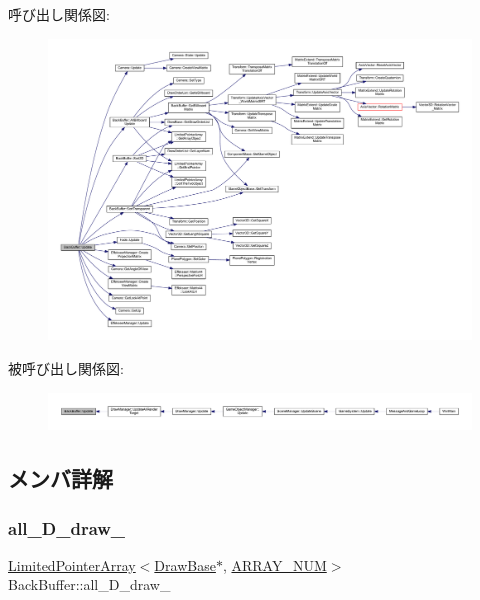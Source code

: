 呼び出し関係図\+:
\nopagebreak
\begin{figure}[H]
\begin{center}
\leavevmode
\includegraphics[width=350pt]{class_back_buffer_a11c7fa5da3d892c72bf6d44e7b269c62_cgraph}
\end{center}
\end{figure}
被呼び出し関係図\+:
\nopagebreak
\begin{figure}[H]
\begin{center}
\leavevmode
\includegraphics[width=350pt]{class_back_buffer_a11c7fa5da3d892c72bf6d44e7b269c62_icgraph}
\end{center}
\end{figure}


\subsection{メンバ詳解}
\mbox{\label{class_back_buffer_a00e14584e9716e4fbfb30053d3cbdee2}} 
\subsubsection{\texorpdfstring{all\+\_\+D\+\_\+draw\+\_\+}{all\_2D\_draw\_}}
{\footnotesize\ttfamily \mbox{\hyperlink{class_limited_pointer_array}{Limited\+Pointer\+Array}}$<$\mbox{\hyperlink{class_draw_base}{Draw\+Base}}$\ast$, \mbox{\hyperlink{class_back_buffer_a28e89a0c543b6ae579c8ab75f9917059}{A\+R\+R\+A\+Y\+\_\+\+N\+UM}}$>$ Back\+Buffer\+::all\+\_\+D\+\_\+draw\+\_\+\hspace{0.3cm}{\ttfamily [private]}}



